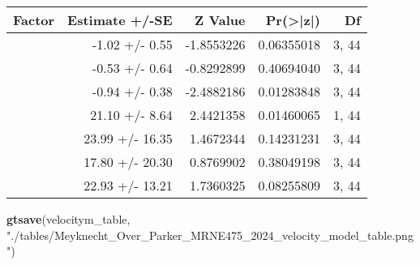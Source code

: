\documentclass[
]{article}
\newenvironment{Shaded}{\begin{snugshade}}{\end{snugshade}}
\newcommand{\FunctionTok}[1]{\textcolor[rgb]{0.13,0.29,0.53}{\textbf{#1}}}
\newcommand{\NormalTok}[1]{#1}
\newcommand{\StringTok}[1]{\textcolor[rgb]{0.31,0.60,0.02}{#1}}
\begin{document}
\begin{table}[!t]
\fontsize{12.0pt}{14.4pt}\selectfont
\begin{tabular*}{\linewidth}{@{\extracolsep{\fill}}>{\raggedright\arraybackslash}p{\dimexpr 300.00pt -2\tabcolsep-1.5\arrayrulewidth}rrrr}
\toprule
Factor & Estimate +/-SE & Z Value & Pr(>|z|) & Df \\ 
\midrule\addlinespace[2.5pt]
{Treatment group 14 °C} & {-1.02  +/-  0.55} & {-1.8553226} & {0.06355018} & {3, 44} \\ 
{Treatment group 16 °C} & {-0.53  +/-  0.64} & {-0.8292899} & {0.40694040} & {3, 44} \\ 
{Treatment group 18 °C} & {-0.94  +/-  0.38} & {-2.4882186} & {0.01283848} & {3, 44} \\ 
{Average length (m)} & {21.10  +/-  8.64} & {2.4421358} & {0.01460065} & {1, 44} \\ 
{Treatment group 14 °C : Average length (m)} & {23.99  +/-  16.35} & {1.4672344} & {0.14231231} & {3, 44} \\ 
{Treatment group 16 °C : Average length (m)} & {17.80  +/-  20.30} & {0.8769902} & {0.38049198} & {3, 44} \\ 
{Treatment group 18 °C : Average length (m)} & {22.93  +/-  13.21} & {1.7360325} & {0.08255809} & {3, 44} \\ 
\bottomrule
\end{tabular*}
\end{table}

\begin{Shaded}
\begin{Highlighting}[]
\FunctionTok{gtsave}\NormalTok{(velocitym\_table, }\StringTok{"./tables/Meyknecht\_Over\_Parker\_MRNE475\_2024\_velocity\_model\_table.png"}\NormalTok{)}
\end{Highlighting}
\end{Shaded}
\end{document}
